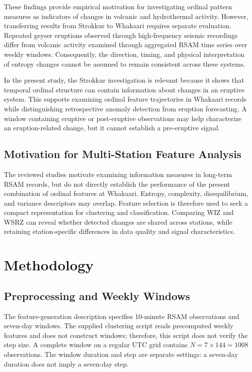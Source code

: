 \documentclass[11pt,a4paper]{article}
\begin{document}
These findings provide empirical motivation for investigating ordinal pattern measures as indicators of changes in volcanic and hydrothermal activity. However, transferring results from Strokkur to Whakaari requires separate evaluation. Repeated geyser eruptions observed through high-frequency seismic recordings differ from volcanic activity examined through aggregated RSAM time series over weekly windows. Consequently, the direction, timing, and physical interpretation of entropy changes cannot be assumed to remain consistent across these systems.
	
In the present study, the Strokkur investigation is relevant because it shows that temporal ordinal structure can contain information about changes in an eruptive system. This supports examining ordinal feature trajectories in Whakaari records while distinguishing retrospective anomaly detection from eruption forecasting. A window containing eruptive or post-eruptive observations may help characterize an eruption-related change, but it cannot establish a pre-eruptive signal.
	
\subsection{Motivation for Multi-Station Feature Analysis}
The reviewed studies motivate examining information measures in long-term RSAM records, but do not directly establish the performance of the present combination of ordinal features at Whakaari. Entropy, complexity, disequilibrium, and variance descriptors may overlap. Feature selection is therefore used to seek a compact representation for clustering and classification. Comparing WIZ and WSRZ can reveal whether detected changes are shared across stations, while retaining station-specific differences in data quality and signal characteristics.
	
\section{Methodology} 

\subsection{Preprocessing and Weekly Windows} 

The feature-generation description specifies 10-minute RSAM observations and seven-day windows. The supplied clustering script reads precomputed weekly features and does not construct windows; therefore, this script does not verify the step size. A complete window on a regular UTC grid contains $N=7\times144=1008$ observations. The window duration and step are separate settings: a seven-day duration does not imply a seven-day step. 
\end{document}
